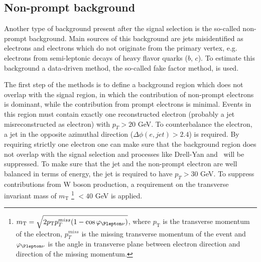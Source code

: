 \subsection{Non-prompt background}
\label{subsec:fakes_description}

Another type of background present after the signal selection is the so-called non-prompt background.
Main sources of this background are jets misidentified as electrons and electrons which do not originate from 
the primary vertex, e.g. electrons from semi-leptonic decays of heavy flavor quarks ($b$, $c$).
To estimate this background a data-driven method, the so-called fake factor method, is used.

The first step of the methods is to define a background region which does not overlap with the signal region, in which the
contribution of non-prompt electrons is dominant, while the contribution from prompt electrons is minimal.
Events in this region must contain exactly one reconstructed electron (probably a jet misreconstructed as electron) with $p_T > 20$ GeV.
To counterbalance the electron, a jet in the opposite azimuthal direction ($\Delta \phi (e,jet) > 2.4$) is required.
By requiring strictly one electron one can make sure that the background region does not overlap with the signal selection and processes 
like Drell-Yan and \ttbar~will be suppressed.
To make sure that the jet and the non-prompt electron are well balanced in terms of energy, the jet is
required to have $p_T > 30$ GeV.
To suppress contributions from W boson production, a requirement on the transverse invariant mass of 
$m_\mathrm{T}$
\footnote{$m_\mathrm{T} = \sqrt{2 p_\mathrm{T} p_T^{miss} (1-\cos\varphi_{\Plepton\nu})}$, where
$p_\mathrm{T}$ is the transverse momentum of the electron, $p_T^{miss}$ is the missing transverse momentum of the event
and $\varphi_{\Plepton\nu}$ is the angle in transverse plane between electron direction and direction of the missing momentum.}
$ < 40$ GeV is applied.


